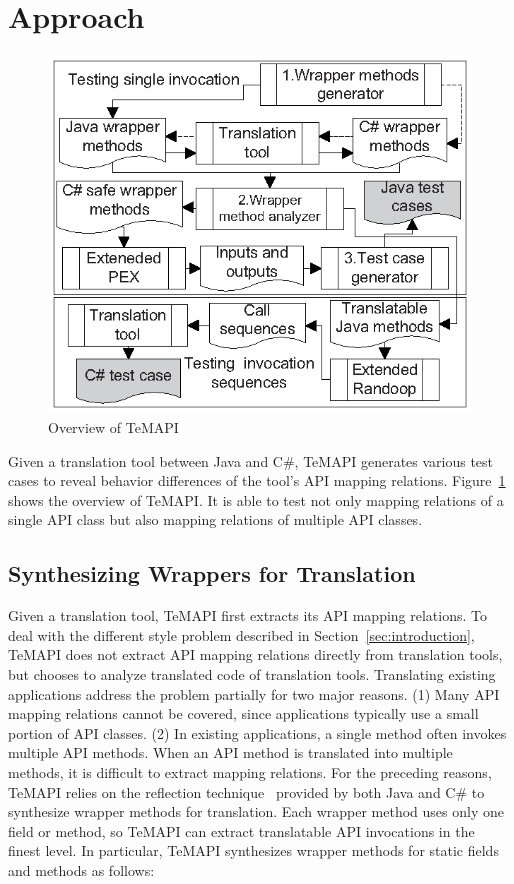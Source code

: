 \section{Approach}
\label{sec:approach}
\begin{figure}[t]
\centering
\includegraphics[scale=1,clip]{figure/approach.eps}\vspace*{-3ex}
 \caption{Overview of TeMAPI}\vspace*{-4ex}
 \label{fig:approach}
\end{figure}
Given a translation tool between Java and C\#, TeMAPI generates various test cases to reveal behavior differences of the tool's API mapping relations.
Figure~\ref{fig:approach} shows the overview of TeMAPI. It is able to test not only mapping relations of a single API class but also mapping relations of multiple API classes.


\subsection{Synthesizing Wrappers for Translation}
\label{sec:approach:generating}
Given a translation tool, TeMAPI first extracts its API mapping relations. To deal with the different style problem described in Section~\ref{sec:introduction}, TeMAPI does not extract API mapping relations directly from translation tools, but chooses to analyze translated code of translation tools.  Translating existing applications address the problem partially for two major reasons. (1) Many API mapping relations cannot be covered, since applications typically use a small portion of API classes. (2) In existing applications, a single method often invokes multiple API methods. When an API method is translated into multiple methods,  it is difficult to extract mapping relations. For the preceding reasons, TeMAPI relies on the reflection technique~\cite{maes1987concepts} provided by both Java and C\# to synthesize wrapper methods for translation. Each wrapper method uses only one field or method, so TeMAPI can extract translatable API invocations in the finest level. In particular, TeMAPI synthesizes wrapper methods for static fields and methods as follows:

